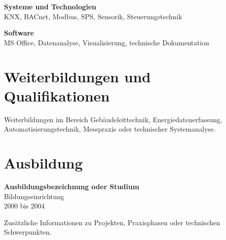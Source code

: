 \documentclass[11pt,a4paper]{article}
\begin{document}
\vspace{0.35cm}

\textbf{Systeme und Technologien}\\
KNX, BACnet, Modbus, SPS, Sensorik, Steuerungstechnik

\vspace{0.35cm}

\textbf{Software}\\
MS Office, Datenanalyse, Visualisierung, technische Dokumentation


\section*{Weiterbildungen und Qualifikationen}

Weiterbildungen im Bereich Gebäudeleittechnik, Energiedatenerfassung, Automatisierungstechnik, Messpraxis oder technischer Systemanalyse.


\section*{Ausbildung}

\textbf{Ausbildungsbezeichnung oder Studium}\\
Bildungseinrichtung\\
2000 bis 2004

Zusätzliche Informationen zu Projekten, Praxisphasen oder technischen Schwerpunkten.
\end{document}
